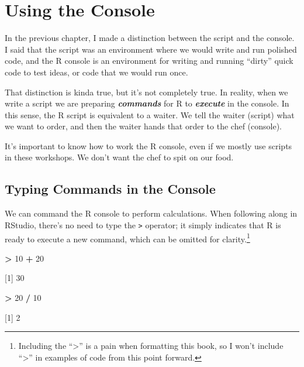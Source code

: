 \documentclass[
]{book}
\newenvironment{Shaded}{\begin{snugshade}}{\end{snugshade}}
\newcommand{\DecValTok}[1]{\textcolor[rgb]{0.00,0.00,0.81}{#1}}
\newcommand{\NormalTok}[1]{#1}
\newcommand{\SpecialCharTok}[1]{\textcolor[rgb]{0.81,0.36,0.00}{\textbf{#1}}}
\begin{document}
\hypertarget{using-the-console}{%
\section{Using the Console}\label{using-the-console}}

In the previous chapter, I made a distinction between the script and the console. I said that the script was an environment where we would write and run polished code, and the R console is an environment for writing and running ``dirty'' quick code to test ideas, or code that we would run once.

That distinction is kinda true, but it's not completely true. In reality, when we write a script we are preparing \textbf{\emph{commands}} for R to \textbf{\emph{execute}} in the console. In this sense, the R script is equivalent to a waiter. We tell the waiter (script) what we want to order, and then the waiter hands that order to the chef (console).

It's important to know how to work the R console, even if we mostly use scripts in these workshops. We don't want the chef to spit on our food.

\hypertarget{typing-commands-in-the-console}{%
\subsection{Typing Commands in the Console}\label{typing-commands-in-the-console}}

We can command the R console to perform calculations. When following along in RStudio, there's no need to type the \texttt{\textgreater{}} operator; it simply indicates that R is ready to execute a new command, which can be omitted for clarity.\footnote{Including the ``\textgreater{}'' is a pain when formatting this book, so I won't include ``\textgreater{}'' in examples of code from this point forward.}

\begin{Shaded}
\begin{Highlighting}[]
\SpecialCharTok{\textgreater{}} \DecValTok{10} \SpecialCharTok{+} \DecValTok{20}

\NormalTok{[}\DecValTok{1}\NormalTok{] }\DecValTok{30}
\end{Highlighting}
\end{Shaded}

\begin{Shaded}
\begin{Highlighting}[]
\SpecialCharTok{\textgreater{}} \DecValTok{20} \SpecialCharTok{/} \DecValTok{10}

\NormalTok{[}\DecValTok{1}\NormalTok{] }\DecValTok{2}
\end{Highlighting}
\end{Shaded}
\end{document}
